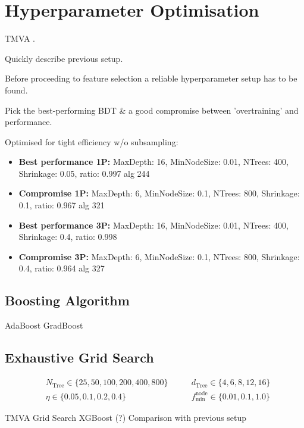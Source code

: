 \section{Hyperparameter Optimisation}
\label{sec:bdt_hyperparam}

TMVA \cite{tmva}.

Quickly describe previous setup.

Before proceeding to feature selection a reliable hyperparameter setup has to be
found.

Pick the best-performing BDT \& a good compromise between 'overtraining' and
performance.

Optimised for tight efficiency w/o subsampling:
\begin{itemize}
\item \textbf{Best performance 1P:} MaxDepth: 16, MinNodeSize: 0.01, NTrees:
  400, Shrinkage: 0.05, ratio: 0.997 \textrightarrow alg 244
\item \textbf{Compromise 1P:} MaxDepth: 6, MinNodeSize: 0.1, NTrees: 800,
  Shrinkage: 0.1, ratio: 0.967 \textrightarrow alg 321
\item \textbf{Best performance 3P:} MaxDepth: 16, MinNodeSize: 0.01, NTrees:
  400, Shrinkage: 0.4, ratio: 0.998 
\item \textbf{Compromise 3P:} MaxDepth: 6, MinNodeSize: 0.1, NTrees: 800,
  Shrinkage: 0.4, ratio: 0.964 \textrightarrow alg 327
\end{itemize}

\subsection{Boosting Algorithm}
\label{sec:bdt_boosting}

AdaBoost \textrightarrow GradBoost

\subsection{Exhaustive Grid Search}
\label{sec:bdt_grid_search}

\begin{align*}
  &N_\mathrm{Tree} \in \{25, 50, 100, 200, 400, 800\} \qquad
  &d_\mathrm{Tree} \in \{4, 6, 8, 12, 16\} \\
  &\eta \in \{0.05, 0.1, 0.2, 0.4\} \qquad
  &f_\mathrm{min}^\mathrm{node} \in \{0.01, 0.1, 1.0\}
\end{align*}

TMVA Grid Search
XGBoost (?)
Comparison with previous setup

